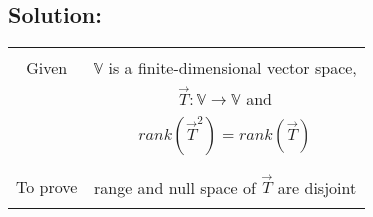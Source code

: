 \documentclass[journal,12pt,twocolumn]{IEEEtran}
\begin{document}
\subsection*{Solution:}
\begin{table}[h!]
\begin{center}
\begin{tabular}{|c|c|}
\hline
& \\
Given & $\mathbb{V}$ is a finite-dimensional vector space,\\
& $\vec{T}:\mathbb{V} \rightarrow \mathbb{V}$ and\\
& $ rank (\vec{T}^2) = rank (\vec{T})$\\
&\\
\hline
& \\
To prove & range and null space of $\vec{T}$ are disjoint\\
& \\
\hline
\end{tabular}
\end{center}
\end{table}
\end{document}
